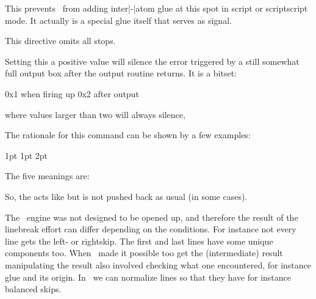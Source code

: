 \startoldprimitive[title={\prm {nonscript}}]

This prevents \TEX\ from adding inter|-|atom glue at this spot in script or
scriptscript mode. It actually is a special glue itself that serves as signal.

\stopoldprimitive

\startoldprimitive[title={\prm {nonstopmode}}]

This directive omits all stops.

\stopoldprimitive

\startnewprimitive[title={\prm {nooutputboxerror}}]

Setting this a positive value will silence the error triggered by a still
somewhat full output box after the output routine returns. It is a bitset:

\starttabulate[|T||]
\NC 0x1 \NC when firing up \NC \NR
\NC 0x2 \NC after output   \NC \NR
\stoptabulate

where values larger than two will always silence,

\stopnewprimitive

\startnewprimitive[title={\prm {norelax}}]

The rationale for this command can be shown by a few examples:

\startbuffer
{} 1pt  1pt  2pt
\edef\testa{\ifdim\dimen0=\dimen2\norelax N\else Y\fi}
\edef\testb{\ifdim\dimen0=\dimen2\relax   N\else Y\fi}
\edef\testc{\ifdim\dimen0=\dimen4\norelax N\else Y\fi}
\edef\testd{\ifdim\dimen0=\dimen4\relax   N\else Y\fi}
\edef\teste{\norelax}
\stopbuffer

\typebuffer

The five meanings are:

\start \getbuffer \starttabulate[|T|T|]
\NC \string\testa \NC \meaning\testa \NC \NR
\NC \string\testb \NC \meaning\testb \NC \NR
\NC \string\testc \NC \meaning\testc \NC \NR
\NC \string\testd \NC \meaning\testd \NC \NR
\NC \string\teste \NC \meaning\teste \NC \NR
\stoptabulate \stop

So, the  acts like  but is not pushed back as
usual (in some cases).

\stopnewprimitive

\startnewprimitive[title={\prm {normalizelinemode}}]

The \TEX\ engine was not designed to be opened up, and therefore the result of
the linebreak effort can differ depending on the conditions. For instance not
every line gets the left- or rightskip. The first and last lines have some unique
components too. When \LUATEX\ made it possible too get the (intermediate) result
manipulating the result also involved checking what one encountered, for instance
glue and its origin. In \LUAMETATEX\ we can normalize lines so that they have for
instance balanced skips.

